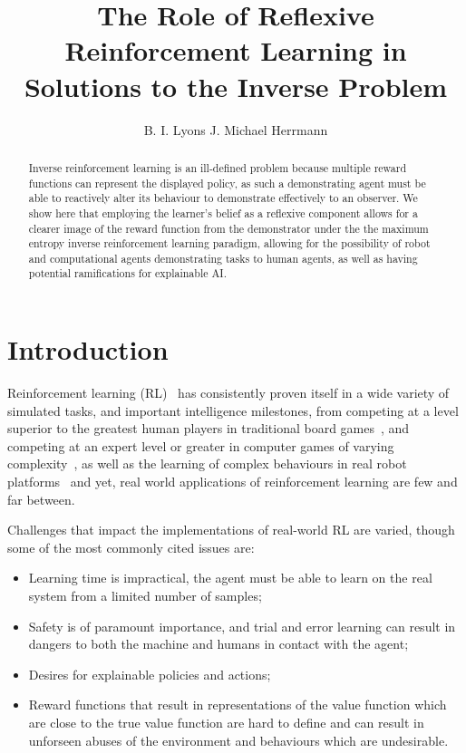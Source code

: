 \documentclass[10pt,technote]{IEEEtran}
\author{B. I. Lyons \quad J. Michael Herrmann}
\title{The Role of Reflexive Reinforcement Learning in Solutions to the Inverse Problem}
\begin{document}
\maketitle
\begin{abstract}
Inverse reinforcement learning is an ill-defined problem because multiple reward functions can represent the displayed policy, as such a demonstrating agent must be able to reactively alter its behaviour to demonstrate effectively to an observer. We show here that employing the learner's belief as a reflexive component allows for a clearer image of the reward function from the demonstrator under the the maximum entropy inverse reinforcement learning paradigm, allowing for the possibility of robot and computational agents demonstrating tasks to human agents, as well as having potential ramifications for explainable AI.
\end{abstract}

\section{Introduction}

Reinforcement learning (RL)~\cite{sutton2018reinforcement} has consistently proven itself in a wide variety of simulated tasks, and important intelligence milestones, from competing at a level superior to the greatest human players in traditional board games~\cite{campbell2002deep, silver2017mastering}, and competing at an expert level or greater in computer games of varying complexity~\cite{berner2019dota, mnih2013playing}, as well as the learning of complex behaviours in real robot platforms~\cite{andrychowicz2020learning, morimoto2001acquisition, asada1996purposive, karnchanachari2020practical} and yet, real world applications of reinforcement learning are few and far between.

Challenges that impact the implementations of real-world RL are varied, though some of the most commonly cited issues are:

\begin{itemize}
\item Learning time is impractical, the agent must be able to learn on the real system from a limited number of samples;
\item Safety is of paramount importance, and trial and error learning can result in dangers to both the machine and humans in contact with the agent;
\item Desires for explainable policies and actions;
\item Reward functions that result in representations of the value function which are close to the true value function are hard to define and can result in unforseen abuses of the environment and behaviours which are undesirable.
\end{itemize}
\end{document}
